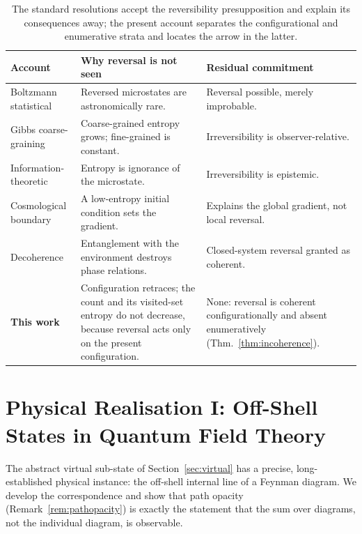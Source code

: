\documentclass[11pt,a4paper]{article}
\theoremstyle{thmstyle}
\theoremstyle{definition}
\theoremstyle{remark}
\begin{document}
\begin{table}[t]
\centering
\small
\renewcommand{\arraystretch}{1.25}
\begin{tabular}{p{}p{}p{}}
\toprule
\textbf{Account} & \textbf{Why reversal is not seen} &
\textbf{Residual commitment} \\
\midrule
Boltzmann statistical \citep{boltzmann1877} &
Reversed microstates are astronomically rare. &
Reversal possible, merely improbable. \\
Gibbs coarse-graining \citep{gibbs1902} &
Coarse-grained entropy grows; fine-grained is constant. &
Irreversibility is observer-relative. \\
Information-theoretic \citep{jaynes1957} &
Entropy is ignorance of the microstate. &
Irreversibility is epistemic. \\
Cosmological boundary \citep{penrose1989} &
A low-entropy initial condition sets the gradient. &
Explains the global gradient, not local reversal. \\
Decoherence \citep{zurek2003} &
Entanglement with the environment destroys phase relations. &
Closed-system reversal granted as coherent. \\
\midrule
\textbf{This work} &
Configuration retraces; the count and its visited-set entropy do not
decrease, because reversal acts only on the present configuration. &
None: reversal is coherent configurationally and absent enumeratively
(Thm.~\ref{thm:incoherence}). \\
\bottomrule
\end{tabular}
\caption{The standard resolutions accept the reversibility presupposition
and explain its consequences away; the present account separates the
configurational and enumerative strata and locates the arrow in the
latter.}
\label{tab:comparison}
\end{table}

\section{Physical Realisation I: Off-Shell States in Quantum Field Theory}
\label{sec:qft}

The abstract virtual sub-state of Section~\ref{sec:virtual} has a precise,
long-established physical instance: the off-shell internal line of a
Feynman diagram. We develop the correspondence and show that path opacity
(Remark~\ref{rem:pathopacity}) is exactly the statement that the sum over
diagrams, not the individual diagram, is observable.
\end{document}
